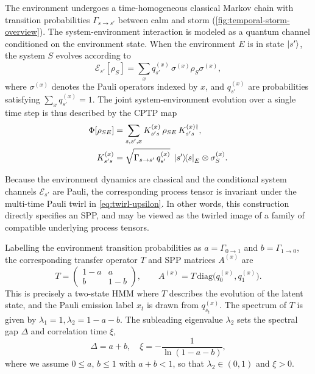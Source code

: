 \documentclass[
    aps,
    prx,
    reprint,
    superscriptaddress,
    longbibliography,
    nofootinbib,
    floatfix,
]{revtex4-2}
\newcommand{\ketbra}[2]{\ket{#1}\!\!\bra{#2}}  %
\begin{document}
The environment undergoes a time-homogeneous classical Markov chain with transition probabilities \(\Gamma_{s\to s'}\) between calm and storm (\cref{fig:temporal-storm-overview}). The system-environment interaction is modeled as a quantum channel conditioned on the environment state. When the environment \(E\) is in state \(\ket{s'}\), the system \(S\) evolves according to
\begin{equation}
    \mathcal{E}_{s'}[\rho_S]
    = \sum_x q^{(x)}_{s'} \,\sigma^{(x)} \rho_S \sigma^{(x)},
\end{equation}
where \(\sigma^{(x)}\) denotes the Pauli operators indexed by \(x\), and \(q^{(x)}_{s'}\) are probabilities satisfying \(\sum_x q^{(x)}_{s'} = 1\). The joint system-environment evolution over a single time step is thus described by the CPTP map
\begin{equation}
    \begin{aligned}
        \Phi[\rho_{SE}]
        &= \sum_{s,s',x} K^{(x)}_{s's} \,\rho_{SE}\, K^{(x)\dagger}_{s's},
        \\
        K^{(x)}_{s's}
        &= \sqrt{\Gamma_{s\to s'}\,q^{(x)}_{s'}}\;
        \ketbra{s'}{s}_E \otimes \sigma^{(x)}_S.
    \end{aligned}
\end{equation}

Because the environment dynamics are classical and the conditional system channels \(\mathcal{E}_{s'}\) are Pauli, the corresponding process tensor is invariant under the multi-time Pauli twirl in \cref{eq:twirl-upsilon}. In other words, this construction directly specifies an SPP, and may be viewed as the twirled image of a family of compatible underlying process tensors.

Labelling the environment transition probabilities as \(a = \Gamma_{0\to 1}\) and \(b = \Gamma_{1\to 0}\), the corresponding transfer operator \(T\) and SPP matrices \(A^{(x)}\) are
\begin{equation}
    T
    =
    \begin{pmatrix}
        1 - a & a \\
        b & 1 - b
    \end{pmatrix},
    \qquad
    A^{(x)} = T\,\mathrm{diag}\big(q_0^{(x)}, q_1^{(x)}\big).
\end{equation}
This is precisely a two-state HMM where \(T\) describes the evolution of the latent state, and the Pauli emission label \(x_t\) is drawn from \(q_{s_t}^{(x)}\). The spectrum of \(T\) is given by \(\lambda_1 = 1, \lambda_2 = 1 - a - b\). The subleading eigenvalue \(\lambda_2\) sets the spectral gap \(\Delta\) and correlation time \(\xi\),
\begin{equation}\label{eq:storm-spectral-gap}
    \Delta = a + b, \quad \xi = -\frac{1}{\ln(1-a-b)},
\end{equation}
where we assume \(0 \le a\), \(b \le 1\) with \(a + b < 1\), so that \(\lambda_2 \in (0, 1)\) and \(\xi > 0\).
\end{document}
